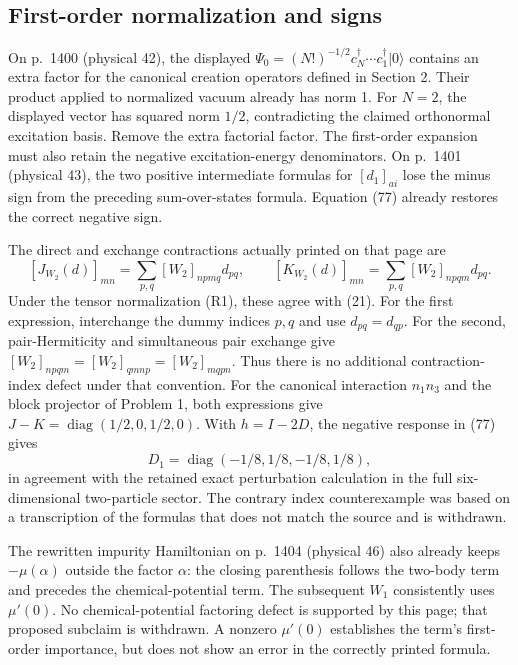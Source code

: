 \documentclass[10pt]{article}
\begin{document}
\subsection*{First-order normalization and signs}
On p. 1400 (physical 42), the displayed \(\Psi_0=(N!)^{-1/2}c_N^\dagger\cdots c_1^\dagger|0\rangle\) contains an extra factor for the canonical creation operators defined in Section 2. Their product applied to normalized vacuum already has norm 1. For \(N=2\), the displayed vector has squared norm \(1/2\), contradicting the claimed orthonormal excitation basis. Remove the extra factorial factor. The first-order expansion must also retain the negative excitation-energy denominators. On p. 1401 (physical 43), the two positive intermediate formulas for \([d_1]_{ai}\) lose the minus sign from the preceding sum-over-states formula. Equation (77) already restores the correct negative sign.\par
The direct and exchange contractions actually printed on that page are \[[J_{W_2}(d)]_{mn}=\sum_{p,q}[W_2]_{npmq}d_{pq},\qquad
 [K_{W_2}(d)]_{mn}=\sum_{p,q}[W_2]_{npqm}d_{pq}.\] Under the tensor normalization (R1), these agree with (21). For the first expression, interchange the dummy indices \(p,q\) and use \(d_{pq}=d_{qp}\). For the second, pair-Hermiticity and simultaneous pair exchange give \([W_2]_{npqm}=[W_2]_{qmnp}=[W_2]_{mqpn}\). Thus there is no additional contraction-index defect under that convention. For the canonical interaction \(n_1n_3\) and the block projector of Problem 1, both expressions give \(J-K=\operatorname{diag}(1/2,0,1/2,0)\). With \(h=I-2D\), the negative response in (77) gives \[D_1=\operatorname{diag}(-1/8,1/8,-1/8,1/8),\] in agreement with the retained exact perturbation calculation in the full six-dimensional two-particle sector. The contrary index counterexample was based on a transcription of the formulas that does not match the source and is withdrawn.\par
The rewritten impurity Hamiltonian on p. 1404 (physical 46) also already keeps \(-\mu(\alpha)\) outside the factor \(\alpha\): the closing parenthesis follows the two-body term and precedes the chemical-potential term. The subsequent \(W_1\) consistently uses \(\mu'(0)\). No chemical-potential factoring defect is supported by this page; that proposed subclaim is withdrawn. A nonzero \(\mu'(0)\) establishes the term’s first-order importance, but does not show an error in the correctly printed formula.\par
\end{document}
